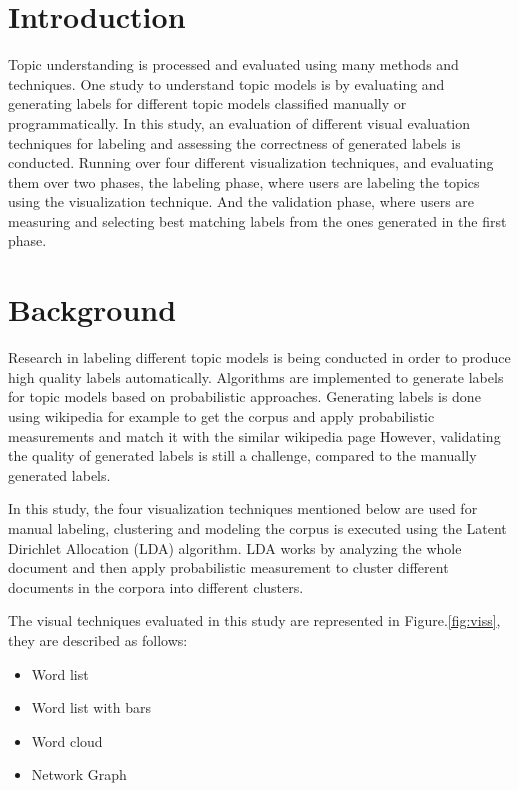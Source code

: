 \section{Introduction}
\label{sec:intro}

Topic understanding is processed and evaluated using many methods and techniques. One study to understand topic models is by evaluating and
generating labels for different topic models classified manually or programmatically. In this study, an evaluation of different visual evaluation techniques
for labeling and assessing the correctness of generated labels is conducted. Running over four different visualization techniques, and evaluating them
over two phases, the labeling phase, where users are labeling the topics using the visualization technique. And the validation phase, where users are
measuring and selecting best matching labels from the ones generated in the first phase.

\section{Background}
\label{sec:bg}

Research in labeling different topic models is being conducted in order to produce high quality labels automatically. Algorithms are implemented
to generate labels for topic models based on probabilistic approaches. Generating labels
is done using wikipedia for example to get the corpus and apply probabilistic measurements and match it with the similar wikipedia page
However, validating the quality of generated labels is still a challenge, compared to the manually generated labels.

\newParagraph
In this study, the four visualization techniques mentioned below are used for manual labeling, clustering and modeling the corpus is executed using the
Latent Dirichlet Allocation (LDA) algorithm. LDA works by analyzing the whole document and then apply probabilistic measurement to cluster different documents
in the corpora into different clusters.

\newParagraph
The visual techniques evaluated in this study are represented in Figure.\ref{fig:viss}, they are described as follows:
\begin{itemize}
  \item Word list
  \item Word list with bars
  \item Word cloud
  \item Network Graph
\end{itemize}

